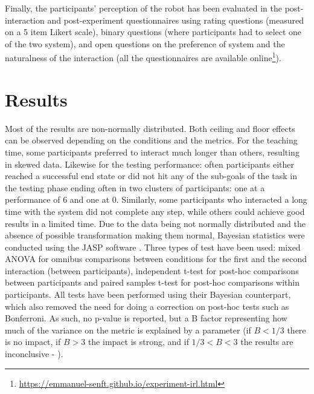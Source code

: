 Finally, the participants' perception of the robot has been evaluated in the post-interaction and post-experiment questionnaires using rating questions (measured on a 5 item Likert scale), binary questions (where participants had to select one of the two system), and open questions on the preference of system and the naturalness of the interaction (all the questionnaires are available online\footnote{\url{https://emmanuel-senft.github.io/experiment-irl.html}}). 

\section{Results}

Most of the results are non-normally distributed. Both ceiling and floor effects can be observed depending on the conditions and the metrics. For the teaching time, some participants preferred to interact much longer than others, resulting in skewed data. Likewise for the testing performance: often participants either reached a successful end state or did not hit any of the sub-goals of the task in the testing phase ending often in two clusters of participants: one at a performance of 6 and one at 0.  Similarly, some participants who interacted a long time with the system did not complete any step, while others could achieve good results in a limited time. Due to the data being not normally distributed and the absence of possible transformation making them normal, Bayesian statistics were conducted using the JASP software \citep{jasp2018}. Three types of test have been used: mixed ANOVA for omnibus comparisons between conditions for the first and the second interaction (between participants), independent t-test for post-hoc comparisons between participants and paired samples t-test for post-hoc comparisons within participants. All tests have been performed using their Bayesian counterpart, which also removed the need for doing a correction on post-hoc tests such as Bonferroni. As such, no p-value is reported, but a B factor representing how much of the variance on the metric is explained by a parameter (if $B < 1/3$ there is no impact, if $B > 3$ the impact is strong, and if $1/3<B<3$ the results are inconclusive - \citealt{jeffreys1998theory,dienes2011bayesian}).



